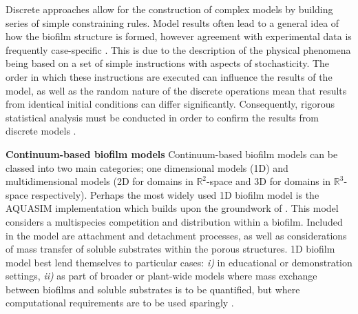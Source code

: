 \skippingparagraph
Discrete approaches allow for the construction of complex models by building series of simple constraining rules. Model results often lead to a general idea of how the biofilm structure is formed, however agreement with experimental data is frequently case-specific \cite{dacunto2017}. This is due to the description of the physical phenomena being based on a set of simple instructions with aspects of stochasticity. The order in which these instructions are executed can influence the results of the model, as well as the random nature of the discrete operations mean that results from identical initial conditions can differ significantly. Consequently, rigorous statistical analysis must be conducted in order to confirm the results from discrete models \cite{alpkvist2006}.

\textbf{Continuum-based biofilm models}
Continuum-based biofilm models can be classed into two main categories; one dimensional models (1D) and multidimensional models (2D for domains in $\mathbb{R}^2$-space and 3D for domains in $\mathbb{R}^3$-space respectively). Perhaps the most widely used 1D biofilm model is the AQUASIM implementation \cite{reichert1994} which builds upon the groundwork of \cite{wanner1986} \cite{wanner1986}. This model considers a multispecies competition and distribution within a biofilm. Included in the model are attachment and detachment processes, as well as considerations of mass transfer of soluble substrates within the porous structures. 1D biofilm model best lend themselves to particular cases: \textit{i)} in educational or demonstration settings, \textit{ii)} as part of broader or plant-wide models where mass exchange between biofilms and soluble substrates is to be quantified, but where computational requirements are to be used sparingly \cite{dacunto2017}.
\skippingparagraph

